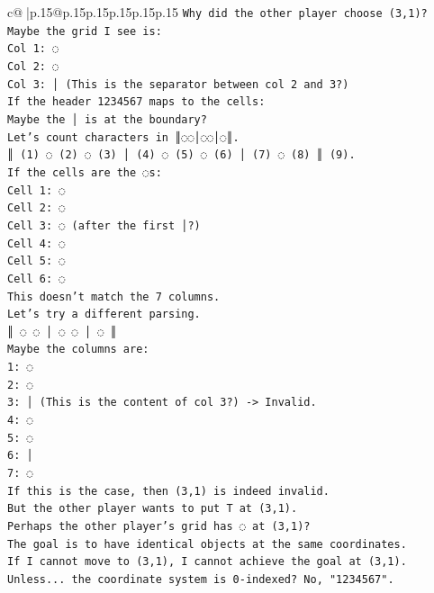 \documentclass{article}
\begin{document}
{\begin{supertabular}{c@{$\;$}|p{.15\linewidth}@{}p{.15\linewidth}p{.15\linewidth}p{.15\linewidth}p{.15\linewidth}p{.15\linewidth}}
{{{\texttt{Why did the other player choose (3,1)?} \\
\texttt{Maybe the grid I see is:} \\
\texttt{Col 1: ◌} \\
\texttt{Col 2: ◌} \\
\texttt{Col 3: │ (This is the separator between col 2 and 3?)} \\
\texttt{If the header 1234567 maps to the cells:} \\
\texttt{Maybe the │ is at the boundary?} \\
\texttt{Let's count characters in ║◌◌│◌◌│◌║.} \\
\texttt{║ (1) ◌ (2) ◌ (3) │ (4) ◌ (5) ◌ (6) │ (7) ◌ (8) ║ (9).} \\
\texttt{If the cells are the ◌s:} \\
\texttt{Cell 1: ◌} \\
\texttt{Cell 2: ◌} \\
\texttt{Cell 3: ◌ (after the first │?)} \\
\texttt{Cell 4: ◌} \\
\texttt{Cell 5: ◌} \\
\texttt{Cell 6: ◌} \\
\texttt{This doesn't match the 7 columns.} \\
\texttt{Let's try a different parsing.} \\
\texttt{║ ◌ ◌ │ ◌ ◌ │ ◌ ║} \\
\texttt{Maybe the columns are:} \\
\texttt{1: ◌} \\
\texttt{2: ◌} \\
\texttt{3: │ (This is the content of col 3?) {-}> Invalid.} \\
\texttt{4: ◌} \\
\texttt{5: ◌} \\
\texttt{6: │} \\
\texttt{7: ◌} \\
\texttt{If this is the case, then (3,1) is indeed invalid.} \\
\texttt{But the other player wants to put T at (3,1).} \\
\texttt{Perhaps the other player's grid has ◌ at (3,1)?} \\
\texttt{The goal is to have identical objects at the same coordinates.} \\
\texttt{If I cannot move to (3,1), I cannot achieve the goal at (3,1).} \\
\texttt{Unless... the coordinate system is 0{-}indexed? No, "1234567".} \\
}}}
\end{supertabular}}
\end{document}
